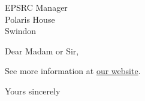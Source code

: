 \documentclass[
  fromemail,          %
  fromphone,          %
  foldmarks=false,    %
  parskip
]{bristol-cs-letter}
\begin{document}

\begin{letter}{
  EPSRC Manager\\
  Polaris House\\
  Swindon
}


\opening{Dear Madam or Sir,}

\lipsum[1-5]

See more information at \href{https://www.cs.bristol.ac.uk}{our website}.

\closing{Yours sincerely} %



\end{letter}
\end{document}
